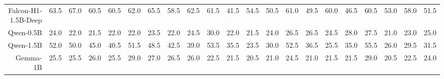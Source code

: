 \documentclass[letterpaper]{article} %
\begin{document}
\begin{table}[t]
\begin{tabular}{rrrrr|rrrr|rrrr|rrrr|rrrr}
 Falcon-H1-1.5B-Deep & \cellcolor[HTML]{D5EACC}63.5 & \cellcolor[HTML]{CEE8CC}67.0 & \cellcolor[HTML]{DBEBCC}60.5 & \cellcolor[HTML]{DBEBCC}60.5 & \cellcolor[HTML]{D6EACC}62.0 & \cellcolor[HTML]{CFE9CC}65.5 & \cellcolor[HTML]{DDEBCC}58.5 & \cellcolor[HTML]{D5EACC}62.5 & \cellcolor[HTML]{DCEBCC}61.5 & \cellcolor[HTML]{FEEECC}41.5 & \cellcolor[HTML]{EAEECC}54.5 & \cellcolor[HTML]{F2F0CC}50.5 & \cellcolor[HTML]{D6EACC}61.0 & \cellcolor[HTML]{EFEFCC}49.5 & \cellcolor[HTML]{D8EACC}60.0 & \cellcolor[HTML]{F6F0CC}46.5 & \cellcolor[HTML]{D6EACC}60.5 & \cellcolor[HTML]{E7EDCC}53.0 & \cellcolor[HTML]{DCEBCC}58.0 & \cellcolor[HTML]{EAEECC}51.5 \\
Qwen-0.5B & \cellcolor[HTML]{FAD6CC}24.0 & \cellcolor[HTML]{F9D3CC}22.0 & \cellcolor[HTML]{F9D2CC}21.5 & \cellcolor[HTML]{F9D3CC}22.0 & \cellcolor[HTML]{F9D4CC}22.0 & \cellcolor[HTML]{FAD6CC}23.5 & \cellcolor[HTML]{F9D4CC}22.0 & \cellcolor[HTML]{FAD7CC}24.5 & \cellcolor[HTML]{FBDDCC}30.0 & \cellcolor[HTML]{F9D1CC}22.0 & \cellcolor[HTML]{F9D0CC}21.5 & \cellcolor[HTML]{F9D4CC}24.0 & \cellcolor[HTML]{FAD8CC}26.5 & \cellcolor[HTML]{FAD8CC}26.5 & \cellcolor[HTML]{FAD4CC}24.5 & \cellcolor[HTML]{FBDACC}28.0 & \cellcolor[HTML]{FBDACC}27.5 & \cellcolor[HTML]{F9CFCC}21.0 & \cellcolor[HTML]{F9D3CC}23.0 & \cellcolor[HTML]{FAD6CC}25.0 \\
Qwen-1.5B & \cellcolor[HTML]{ECEECC}52.0 & \cellcolor[HTML]{F0EFCC}50.0 & \cellcolor[HTML]{FAF1CC}45.0 & \cellcolor[HTML]{FEEFCC}40.5 & \cellcolor[HTML]{ECEECC}51.5 & \cellcolor[HTML]{F2EFCC}48.5 & \cellcolor[HTML]{FEF2CC}42.5 & \cellcolor[HTML]{FEEDCC}39.0 & \cellcolor[HTML]{ECEECC}53.5 & \cellcolor[HTML]{FDE5CC}35.5 & \cellcolor[HTML]{F9D3CC}23.5 & \cellcolor[HTML]{FBDDCC}30.0 & \cellcolor[HTML]{E9EECC}52.5 & \cellcolor[HTML]{FDE8CC}36.5 & \cellcolor[HTML]{FAD6CC}25.5 & \cellcolor[HTML]{FDE6CC}35.0 & \cellcolor[HTML]{E1ECCC}55.5 & \cellcolor[HTML]{FAD8CC}26.0 & \cellcolor[HTML]{FBDDCC}29.5 & \cellcolor[HTML]{FCE1CC}31.5 \\
Gemma-1B & \cellcolor[HTML]{FAD8CC}25.5 & \cellcolor[HTML]{FAD8CC}25.5 & \cellcolor[HTML]{FAD9CC}26.0 & \cellcolor[HTML]{FAD8CC}25.5 & \cellcolor[HTML]{FBDECC}29.0 & \cellcolor[HTML]{FBDBCC}27.0 & \cellcolor[HTML]{FBDACC}26.5 & \cellcolor[HTML]{FBDACC}26.0 & \cellcolor[HTML]{F9D1CC}22.5 & \cellcolor[HTML]{F9D0CC}21.5 & \cellcolor[HTML]{F8CECC}20.5 & \cellcolor[HTML]{F9CFCC}21.0 & \cellcolor[HTML]{FAD4CC}24.5 & \cellcolor[HTML]{F8CECC}21.0 & \cellcolor[HTML]{F9CFCC}21.5 & \cellcolor[HTML]{F9CFCC}21.5 & \cellcolor[HTML]{FBDDCC}29.0 & \cellcolor[HTML]{F8CECC}20.5 & \cellcolor[HTML]{F9D2CC}22.5 & \cellcolor[HTML]{FAD4CC}24.0 \\

\end{tabular}
\end{table}
\end{document}
